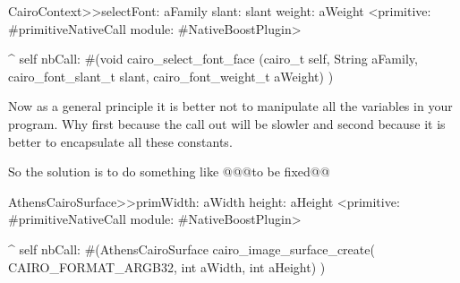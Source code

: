 \documentclass[a4paper,10pt,twoside]{book}
\begin{document}
\begin{code}{}
CairoContext>>selectFont: aFamily slant: slant weight: aWeight
	<primitive: #primitiveNativeCall module: #NativeBoostPlugin>
	
	^ self nbCall: #(void cairo_select_font_face (cairo_t self,
                                                         String aFamily,
                                                         cairo_font_slant_t slant,
                                                         cairo_font_weight_t aWeight) )
\end{code}


Now as a general principle it is better not to manipulate all the
variables in your program. Why first because the call out will be
slowler and second because it is better to encapsulate all these
constants. 

So the solution is to do something like
@@@to be fixed@@
\begin{code}{}
AthensCairoSurface>>primWidth: aWidth height: aHeight
	<primitive: #primitiveNativeCall module: #NativeBoostPlugin>
	
	^ self nbCall: #(AthensCairoSurface cairo_image_surface_create(
				CAIRO_FORMAT_ARGB32,
					int aWidth,
					int aHeight) )
	
\end{code}

% 
% 
% 
\end{document}
